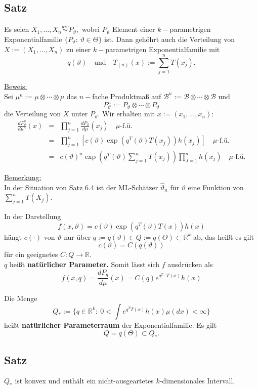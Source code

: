 \documentclass[a4paper,11pt,twoside,titlepage]{article}
\newcommand{\R}{{\mathbb R}}
\newcommand{\B}{{\mathcal B}} %
\newcommand{\uiv}{\ensuremath{\stackrel{uiv}{\sim}}}
\begin{document}
\newpage
\subsection{Satz}
Es seien $X_1,\ldots,X_n\uiv P_\vartheta,$
wobei $P_\vartheta$ Element einer $k-$parametrigen Exponentialfamilie
$\{P_\vartheta: \, \vartheta \in \Theta\}$ ist. Dann geh\"ohrt auch
die Verteilung von $X:=(X_1,\ldots,X_n)$ zu einer $k-$parametrigen
Exponentialfamilie mit
$$q(\vartheta)\quad  \text{und} \quad T_{(n)}(x):=\sum_{j=1}^n T(x_j).$$

\underline{Beweis:}\\
Sei $\mu^n:=\mu \otimes\cdots\otimes\mu$ das $n-$fache Produktmaß auf $\B^n:=\B\otimes\cdots\otimes\B$ und
$$ P_\vartheta^n:=P_\vartheta\otimes\cdots \otimes P_\vartheta$$
die Verteilung von $X$ unter $P_\vartheta.$ Wir erhalten mit $x:=(x_1,\ldots,x_n):$
\begin{eqnarray*}
  \frac{ d P^n_\vartheta}{d\mu^n}(x) &=& \prod_{j=1}^n \frac{d P_\vartheta}{d\mu} (x_j) \quad \mu\mbox{-f.ü.}\\
   &=& \prod_{j=1}^n \left[ c(\vartheta) \exp \left( q^{T} (\vartheta)T(x_j)\right) h(x_j)\right] \quad \mu\mbox{-f.ü.}\\
   &=& c(\vartheta)^n \exp\left(q^{T} (\vartheta) \sum_{j=1}^n T(x_j)\right) \prod_{J=1}^n h(x_j)\quad \mu\mbox{-f.ü.}
\end{eqnarray*}

\underline{Bemerkung:}\\ 
In der Situation von Satz 6.4 ist der ML-Schätzer $\hat\vartheta_n$
für $\vartheta$ eine Funktion von $\sum_{j=1}^n T(X_j)$.

In der Darstellung  $$f(x,\vartheta) = c(\vartheta) \exp(q^{T} (\vartheta) T(x)) h(x)$$
hängt $c(\cdot)$ von $\vartheta$ nur über
$q:=q(\vartheta)\in Q:=q(\Theta)\subset\R^k$ ab, das heißt es gilt
$$c(\vartheta)=C\left(q(\vartheta)\right)$$
f\"ur ein geeignetes $C: Q\rightarrow \R.$\\
$q$ hei\ss t {\bf nat\"urlicher Parameter.}
Somit l\"asst sich $f$ ausdr\"ucken als
\[ f(x,q) = \frac{ d P_q}{d\mu}(x)=C(q) e^{q^{T} \cdot T(x)}h(x)\]

Die Menge
\[ Q_* := \{q\in\R^k:~ 0<\int e^{q^{T} T(x)} h(x) \mu(dx)<\infty\}
\]
hei\ss t {\bf nat\"urlicher Parameterraum} der Exponentialfamilie. Es gilt
$$Q=q(\Theta)\subset Q_*.$$

\subsection{Satz}
$Q_*$ ist konvex und enthält ein nicht-ausgeartetes $k$-dimensionales Intervall.
\end{document}
